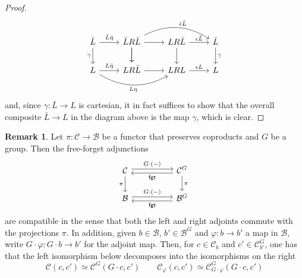 \documentclass[a4paper,10pt
,draft
]{article}%
\numberwithin{equation}{section}
\numberwithin{figure}{section}
\theoremstyle{definition} %
\newtheorem{remark}[equation]{Remark}%
\newcommand{\C}{\ensuremath{\mathcal C}}
\newcommand{\1}{\ensuremath{\mathbbm 1}}%
\begin{document}
\begin{proof}
\begin{equation}
	\begin{tikzcd}
	\bar{L} \ar{d}[swap]{\gamma} \arrow{r}{\bar{L}\bar{\eta}}
	&
	\bar{L} R \bar{L} \arrow[d] \ar{r} \ar{d}
	\arrow[bend left]{rr}{\bar{\epsilon}\bar{L}}
	&
	L R \bar{L} \ar{r}{\epsilon \bar{L}} \ar{d}
	&
	\bar{L} \ar{d}{\gamma}
	\\
	L \arrow{r}{L\bar{\eta}}
	\arrow[bend right]{rr}[swap]{L \eta}
	&
	LR\bar{L} \ar{r}
	&
	LRL \ar{r}{\epsilon L}
	&
	L
	\end{tikzcd}
	\end{equation}
	and, since 
	$\gamma \colon \bar{L} \to L$ is cartesian, 
	it in fact suffices to show that the overall composite 
	$\bar{L} \to L$ in the diagram above
	is the map $\gamma$, which is clear. 
\end{proof}



\begin{remark}
	Let $\pi \colon \mathcal{C} \to \mathcal{B}$
	be a functor that preserves coproducts and $G$ be a group.
	Then the free-forget adjunctions 
	\begin{equation}
	\begin{tikzcd}[column sep =50pt]
	\mathcal{C}
	\arrow[shift left]{r}{G \cdot (-)}
	\arrow[d, "\pi"']
	&
	\mathcal{C}^G 
	\arrow[shift left]{l}{\mathsf{fgt}}
	\arrow[d, "\pi"]
	\\
	\mathcal{B} 
	\arrow[shift left]{r}{G \cdot (-)}
	&
	\mathcal{B}^G
	\arrow[shift left]{l}{\mathsf{fgt}}
	\end{tikzcd}
	\end{equation}
	are compatible in the sense that both the left and right adjoints commute with the projections $\pi$.
	In addition, given $b \in \mathcal{B}$, $b' \in \mathcal{B}^G$
	and $\varphi \colon b \to b'$ a map in $\mathcal{B}$, write
	$G\cdot \varphi \colon G\cdot b \to b'$
	for the adjoint map.
	Then, for $c \in \mathcal{C}_b$ and $c' \in \mathcal{C}^G_{b'}$,
	one has that the left isomorphism below decomposes
	into the isomorphisms on the right
	\begin{equation}\label{ADJOVADJ EQ}
	\C(c,c') 
	\simeq 
	\C^G(G \cdot c,c')\qquad
	\C_{\varphi}(c,c') 
	\simeq 
	\C^G_{G\cdot\varphi}(G \cdot c,c')
	\end{equation}
\end{remark}
\end{document}
